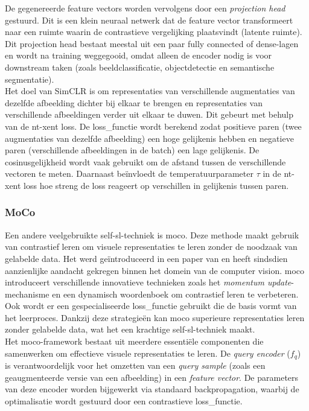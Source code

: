 De gegenereerde feature vectors worden vervolgens door een \emph{projection head} gestuurd. Dit is een klein neuraal netwerk dat de feature vector transformeert naar een ruimte waarin de contrastieve vergelijking plaatsvindt (latente ruimte). Dit projection head bestaat meestal uit een paar  fully connected of dense-lagen en wordt na training weggegooid, omdat alleen de encoder nodig is voor downstream taken (zoals beeldclassificatie, objectdetectie en semantische segmentatie). \autocite{Gupta_2022} \\

Het doel van SimCLR is om representaties van verschillende augmentaties van dezelfde afbeelding dichter bij elkaar te brengen en representaties van verschillende afbeeldingen verder uit elkaar te duwen. Dit gebeurt met behulp van de \gls{nt-xent} loss. De \gls{loss_functie} wordt berekend zodat positieve paren (twee augmentaties van dezelfde afbeelding) een hoge gelijkenis hebben en negatieve paren (verschillende afbeeldingen in de \gls{batch}) een lage gelijkenis. De cosinusgelijkheid wordt vaak gebruikt om de afstand tussen de verschillende vectoren te meten. Daarnaast beïnvloedt de temperatuurparameter $\tau$ in de \gls{nt-xent} loss  hoe streng de loss reageert op verschillen in gelijkenis tussen paren.

\subsubsection{MoCo}

Een andere veelgebruikte \gls{self-sl}-techniek is \gls{moco}. Deze methode maakt gebruik van contrastief leren om visuele representaties te leren zonder de noodzaak van gelabelde data. Het werd geïntroduceerd in een paper van \textcite{He_2019} en heeft sindsdien aanzienlijke aandacht gekregen binnen het domein van de computer vision. \gls{moco} introduceert verschillende innovatieve technieken zoals het \emph{momentum update}-mechanisme en een dynamisch woordenboek om contrastief leren te verbeteren. Ook wordt er een gespecialiseerde \gls{loss_functie} gebruikt die de basis vormt van het leerproces. Dankzij deze strategieën kan \gls{moco} superieure representaties leren zonder gelabelde data, wat het een krachtige \gls{self-sl}-techniek maakt. \\

Het \gls{moco}-framework bestaat uit meerdere essentiële componenten die samenwerken om effectieve visuele representaties te leren. De \emph{query encoder} ($f_q$) is verantwoordelijk voor het omzetten van een \emph{query sample} (zoals een geaugmenteerde versie van een afbeelding) in een \emph{feature vector}. De parameters van deze encoder worden bijgewerkt via standaard backpropagation, waarbij de optimalisatie wordt gestuurd door een contrastieve \gls{loss_functie}. \autocite{Sowe_2025} \\


